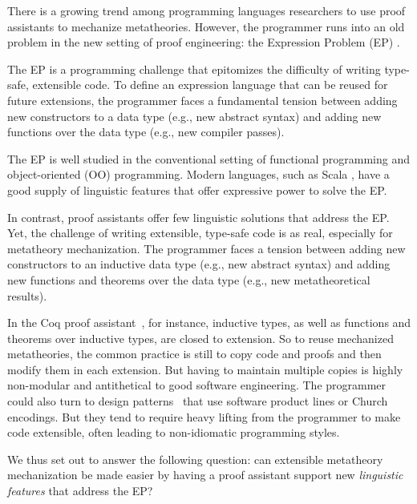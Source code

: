 
There is a growing trend among programming languages researchers
to use proof assistants to mechanize meta\-theories.
%
However, the programmer runs into an old problem
in the new setting of proof engineering:
the Expression Problem (EP) \cite{wadler-ep}.

The EP is a programming challenge that
epitomizes the difficulty of writing type-safe, extensible code.
To define an expression language that can be reused for future extensions,
the programmer faces a fundamental tension \cite{reynolds1975} between
adding new constructors to a data type (e.g., new abstract syntax) and
adding new functions over the data type (e.g., new compiler passes).

The EP is well studied in the conventional setting of functional
programming and object-oriented (OO) programming.
Modern languages, such as Scala \cite{scala-oopsla05}, have a good
supply of linguistic features that offer expressive power to solve the
EP.

In contrast, proof assistants offer few linguistic solutions that
address the EP.
Yet, the challenge of writing extensible, type-safe code is
as real, especially for metatheory mechanization.
The programmer faces a tension between adding new constructors to an inductive data type
(e.g., new abstract syntax) and adding new functions and theorems over
the data type (e.g., new meta\-theoretical results).

In the Coq proof assistant~\cite{coq}, for instance, inductive types, as well as functions and
theorems over inductive types, are closed to extension.
So to reuse mechanized metatheories,
the common practice is still to copy code and proofs and then modify them in each extension.
But having to maintain multiple copies is highly non-modular and
antithetical to good software engineering.
%
The programmer could also turn to design patterns~\cite{delaware2011,delaware2013} that
use software product lines or Church encodings.
But they tend to require heavy lifting from the programmer to make code
extensible, often leading to non-idiomatic programming styles.

We thus set out to answer the following question:
can extensible metatheory mechanization be made easier by
having a proof assistant support new \emph{linguistic features} that address the EP?

